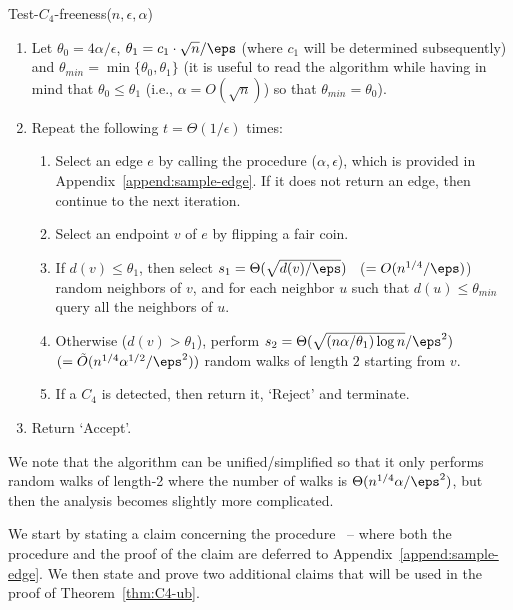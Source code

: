 \medskip\noindent
\textsf{Test-$C_4$-freeness}($n,\epsilon,\alpha$)\label{alg:C4}
\begin{enumerate}
\item Let $\theta_0 = 4\alpha/\epsilon$,
$\theta_1 = c_1\cdot \sqrt{n}/\eps$ (where %
$c_1$ will be determined subsequently) and $\theta_{min}=\min\{\theta_0, \theta_1\}$  (it is useful to read the algorithm while having in mind that $\theta_0\leq \theta_1$ (i.e., $\alpha = O(\sqrt{n})$) so that $\theta_{min}=\theta_0$).
\label{step:set_params_C4}
\item Repeat the following $t=\Theta(1/\epsilon)$ times:
  \begin{enumerate}
     \item Select an edge $e$ by calling the procedure \SelectEdge($\alpha,\epsilon$), which is provided in Appendix~\ref{append:sample-edge}.  If it
     does not return an edge, then continue to the next iteration.
     \item Select an endpoint $v$ of $e$ by flipping a fair coin.
     \item \label{step:random-neighbors} If $d(v) \leq \theta_1$, then select $s_1=\Theta( \sqrt{d(v)/\eps})$ ~($=O(n^{1/4}/\eps)$) random neighbors of $v$, and for each neighbor $u$ such that  
     $d(u) \leq \theta_{min}$
     query all the neighbors of $u$. 
     \item \label{step:random-walk} Otherwise ($d(v) > \theta_1$), perform $s_2=\Theta(\sqrt{  (n\alpha/\theta_1)\log n}/\eps^2)$ 
      \;$(=\tilde{O}(n^{1/4}\alpha^{1/2}/\eps^2))$ 
     random walks of length $2$ starting from $v$. 
     \item If a $C_4$ is detected, then return it, `Reject' and terminate.
  \end{enumerate}
  \item Return `Accept'.
\end{enumerate}
We note that the algorithm can be unified/simplified so that it only performs random walks of length-2 
where the number of walks is $\Theta(n^{1/4}\alpha/\eps^2)$, %
but then the analysis becomes slightly more complicated. %


We start by stating a claim concerning the procedure \SelectEdge\ -- where both the procedure and the proof of the claim are deferred to Appendix~\ref{append:sample-edge}. We then state and prove two additional claims that will be used in the proof of Theorem~\ref{thm:C4-ub}.

